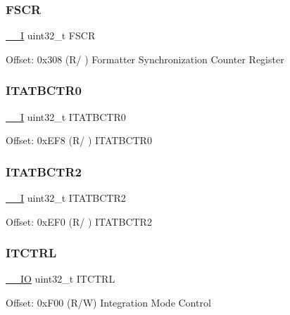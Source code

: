 \subsubsection{\texorpdfstring{FSCR}{FSCR}}
{\footnotesize\ttfamily \mbox{\hyperlink{core__sc300_8h_af63697ed9952cc71e1225efe205f6cd3}{\+\_\+\+\_\+I}} uint32\+\_\+t F\+S\+CR}

Offset\+: 0x308 (R/ ) Formatter Synchronization Counter Register \mbox{\label{struct_t_p_i___type_afa3718bbb523ffb294402f58896592e6}} 
\subsubsection{\texorpdfstring{ITATBCTR0}{ITATBCTR0}}
{\footnotesize\ttfamily \mbox{\hyperlink{core__sc300_8h_af63697ed9952cc71e1225efe205f6cd3}{\+\_\+\+\_\+I}} uint32\+\_\+t I\+T\+A\+T\+B\+C\+T\+R0}

Offset\+: 0x\+E\+F8 (R/ ) I\+T\+A\+T\+B\+C\+T\+R0 \mbox{\label{struct_t_p_i___type_a89c5da21240d76e6b873144202deffa3}} 
\subsubsection{\texorpdfstring{ITATBCTR2}{ITATBCTR2}}
{\footnotesize\ttfamily \mbox{\hyperlink{core__sc300_8h_af63697ed9952cc71e1225efe205f6cd3}{\+\_\+\+\_\+I}} uint32\+\_\+t I\+T\+A\+T\+B\+C\+T\+R2}

Offset\+: 0x\+E\+F0 (R/ ) I\+T\+A\+T\+B\+C\+T\+R2 \mbox{\label{struct_t_p_i___type_ad987483f555c0f6034ef24a8840f337d}} 
\subsubsection{\texorpdfstring{ITCTRL}{ITCTRL}}
{\footnotesize\ttfamily \mbox{\hyperlink{core__sc300_8h_aec43007d9998a0a0e01faede4133d6be}{\+\_\+\+\_\+\+IO}} uint32\+\_\+t I\+T\+C\+T\+RL}

Offset\+: 0x\+F00 (R/W) Integration Mode Control \mbox{\label{struct_t_p_i___type_af2c92c7cb13569aaff6b4f5a25de5056}} 
